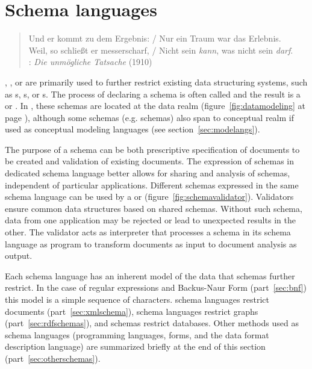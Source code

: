 \section{Schema languages}
\label{sec:schemas}

\begin{quotation}%
Und er kommt zu dem Ergebnis: / Nur ein Traum war das Erlebnis.\\
Weil, so schließt er messerscharf, / 
Nicht sein \emph{kann}, was nicht sein \emph{darf}. \\
\quotationsource{}:
 \textit{Die unmögliche Tatsache} (1910) 
\end{quotation}

\noindent {}, , or  are primarily used to
further restrict existing data structuring systems, such as s, s, or s. The
process of declaring a  schema is often called  and the
result is a  or .
In , these schemas are located at the data realm
(figure~\ref{fig:datamodeling} at page \pageref{fig:datamodeling}), although
some schemas (e.g.  schemas) also span to conceptual realm if used as
conceptual modeling languages (see section~\ref{sec:modelangs}). 

The purpose of a schema can be both prescriptive specification of documents to
be created and validation of existing documents. The expression of schemas in
dedicated schema language better allows for sharing and analysis of schemas,
independent of particular applications. Different schemas expressed in the same
schema language can be used by a  or 
(figure~\ref{fig:schemavalidator}). Validators ensure common data structures
based on shared schemas.  Without such schema, data from one application may be
rejected or lead to unexpected results in the other. The validator acts as
interpreter that processes a schema in its schema language as program to
transform documents as input to document analysis as output.

Each schema language has an inherent model of the data that schemas further
restrict.  In the case of regular expressions and Backus-Naur Form
(part~\ref{sec:bnf}) this model is a simple sequence of characters. 
schema languages restrict  documents (part~\ref{sec:xmlschema}),
 schema languages restrict  graphs
(part~\ref{sec:rdfschemas}), and  schemas restrict databases.  Other
methods used as schema languages (programming languages, forms, and the data
format description language) are summarized briefly at the end of this section
(part~\ref{sec:otherschemas}).

